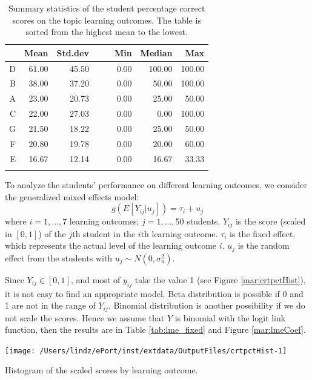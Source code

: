 \documentclass[12pt,english,nohyper]{tufte-handout}\usepackage[]{graphicx}\usepackage[]{color}
\newenvironment{knitrout}{}{} %
\begin{document}
\begin{longtable}{rrrllrrr}
  \hline
 & Mean & Std.dev &   &   & Min & Median & Max \\ 
  \hline
D & 61.00 & 45.50 &  &  & 0.00 & 100.00 & 100.00 \\ 
  B & 38.00 & 37.20 &  &  & 0.00 & 50.00 & 100.00 \\ 
  A & 23.00 & 20.73 &  &  & 0.00 & 25.00 & 50.00 \\ 
  C & 22.00 & 27.03 &  &  & 0.00 & 0.00 & 100.00 \\ 
  G & 21.50 & 18.22 &  &  & 0.00 & 25.00 & 50.00 \\ 
  F & 20.80 & 19.78 &  &  & 0.00 & 20.00 & 60.00 \\ 
  E & 16.67 & 12.14 &  &  & 0.00 & 16.67 & 33.33 \\ 
   \hline
\hline
\caption{Summary statistics of the student percentage correct scores on the topic learning outcomes. The table is sorted from the highest mean to the lowest.} 
\label{tab:LearningObj_summary}
\end{longtable}






To analyze the students' performance on different learning outcomes, we consider the generalized mixed effects model:
\[
g(E[Y_{ij}|u_{j}])= \tau_{i}+u_{j}
\]
where $i=1,...,$7 learning outcomes;
$j=1,...,$50 students. $Y_{ij}$ is the score (scaled in $[0,1]$) of
the $j$th student in the $i$th learning outcome. $\tau_i$ is the fixed effect,
which represents the actual level of the learning outcome $i$.
$u_j$ is the random effect from the students with
$u_{j} \sim N(0,\sigma_{u}^{2})$.

Since $Y_{ij} \in [0,1]$, and most of $y_{ij}$ take the value 1
(see Figure \ref{mar:crtpctHist}), it is not easy to find an appropriate model.
Beta distribution is possible if 0 and 1 are not in the range of $Y_{ij}$.
Binomial distribution is another possibility if we do not scale the scores.
Hence we assume that $Y$ is binomial with the logit link function,
then the results are in Table \ref{tab:lme_fixed} and Figure \ref{mar:lmeCoef}.

\begin{knitrout}
\color{fgcolor}\begin{marginfigure}
\texttt{[image: /Users/lindz/ePort/inst/extdata/OutputFiles/crtpctHist-1]} \caption[Histogram of the scaled scores by learning outcome]{Histogram of the scaled scores by learning outcome.}\label{mar:crtpctHist}
\end{marginfigure}


\end{knitrout}
\end{document}
